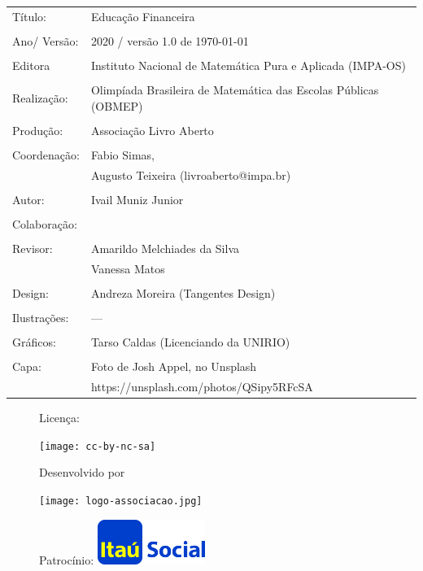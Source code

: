 \begin{tabular}{p{}p{}}
Título: & Educação Financeira\\
\\
Ano/ Versão: & 2020 / versão 1.0 de \today\\
\\
Editora & Instituto Nacional de Matem\'atica Pura e Aplicada (IMPA-OS)\\
\\
Realização:& Olimp\'iada Brasileira de Matem\'atica das Escolas P\'ublicas (OBMEP)\\
\\
Produção:& Associação Livro Aberto\\
\\
Coordenação: & Fabio Simas, \\
			&  Augusto Teixeira (livroaberto@impa.br)\\
\\
  Autor: & Ivail Muniz Junior\\
        
\\
Colaboração: & \\
\\
Revisor: & Amarildo Melchiades da Silva \\
         & Vanessa Matos \\
\\
Design: & Andreza Moreira (Tangentes Design) \\
\\
  Ilustrações: & --- \\ 
\\
Gráficos: & Tarso Caldas (Licenciando da UNIRIO)\\
\\
  Capa: & Foto de Josh Appel, no Unsplash \\
  		& https://unsplash.com/photos/QSipy5RFcSA \\

\end{tabular}
\vspace{.5cm}



\begin{figure}[b]
\begin{minipage}[l]{5cm}
\centering

{\large Licença:}

  \texttt{[image: cc-by-nc-sa]}
\end{minipage}\hfill
\begin{minipage}[c]{5cm}
\centering
{\large Desenvolvido por}

\texttt{[image: logo-associacao.jpg]}
\end{minipage}
\begin{minipage}[r]{5cm}
\centering

{\large Patrocínio:}
  \vspace{1em}
  \includegraphics[width=3.5cm]{itau}
\end{minipage}
\end{figure}

